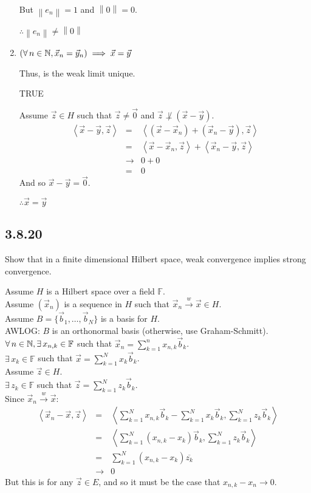 \documentclass[letterpaper,12pt,fleqn]{article}
\newcommand{\vx}{\vec{x}}
\newcommand{\vy}{\vec{y}}
\newcommand{\vz}{\vec{z}}
\newcommand{\vo}{\vec{0}}
\newcommand{\vb}{\vec{b}}
\newcommand{\norm}[1]{\left\|#1\right\|}
\newcommand{\inner}[2]{\left<#1,#2\right>}
\newcommand{\weak}{\overset{w}{\longrightarrow}}
\newcommand{\conj}[1]{\overline{#1}}
\newcommand{\F}{\mathbb{F}}
\begin{document}
\begin{enumerate}[label=(\alph*)]
  But $\norm{e_n}=1$ and $\norm{0}=0$.

  $\therefore\norm{e_n}\ne\norm{0}$

\item $\left(\forall\,n\in\N,\vx_n=\vy_n\right)\implies\vx=\vy$

  Thus, is the weak limit unique.

  TRUE

  Assume $\vz\in H$ such that $\vz\ne\vo$ and $\vz\not\perp(\vx-\vy)$.
  \begin{eqnarray*}
    \inner{\vx-\vy}{\vz} &=& \inner{(\vx-\vx_n)+(\vx_n-\vy)}{\vz} \\
    &=& \inner{\vx-\vx_n}{\vz}+\inner{\vx_n-\vy}{\vz} \\
    &\to& 0+0 \\
    &=& 0
  \end{eqnarray*}
  And so $\vx-\vy=\vo$.

  $\therefore\vx=\vy$
\end{enumerate}

\subsection*{3.8.20}

Show that in a finite dimensional Hilbert space, weak convergence implies
strong convergence.

Assume $H$ is a Hilbert space over a field $\F$. \\
Assume $(\vx_n)$ is a sequence in $H$ such that $\vx_n\weak\vx\in H$. \\
Assume $B=\{\vb_1,\ldots,\vb_N\}$ is a basis for $H$. \\
AWLOG: $B$ is an orthonormal basis (otherwise, use Graham-Schmitt). \\
$\forall\,n\in\N,\exists\,x_{n,k}\in\F$ such that
$\vx_n=\sum_{k=1}^nx_{n,k}\vb_k$. \\
$\exists\,x_k\in\F$ such that $\vx=\sum_{k=1}^Nx_k\vb_k$. \\
Assume $\vz\in H$. \\
$\exists\,z_k\in\F$ such that $\vz=\sum_{k=1}^Nz_k\vb_k$. \\
Since $\vx_n\weak\vx$:
\begin{eqnarray*}
  \inner{\vx_n-\vx}{\vz} &=&
  \inner{\sum_{k=1}^Nx_{n,k}\vb_k-\sum_{k=1}^Nx_k\vb_k}{\sum_{k=1}^Nz_k\vb_k} \\
  &=& \inner{\sum_{k=1}^N(x_{n,k}-x_k)\vb_k}{\sum_{k=1}^Nz_k\vb_k} \\
  &=& \sum_{k=1}^N(x_{n,k}-x_k)\conj{z_k} \\
  &\to& 0
\end{eqnarray*}
But this is for any $\vz\in E$, and so it must be the case that
$x_{n,k}-x_n\to0$.
\end{document}
